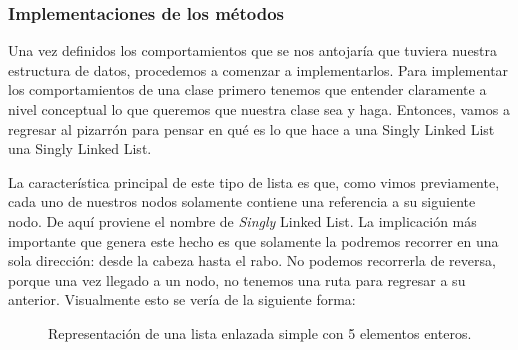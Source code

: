 \documentclass[11pt]{article}
\begin{document}
\subsubsection{Implementaciones de los métodos}
\label{sec:orgdb9b995}

Una vez definidos los comportamientos que se nos antojaría que tuviera nuestra estructura de datos, procedemos a comenzar a implementarlos. Para implementar los comportamientos de una clase primero tenemos que entender claramente a nivel conceptual lo que queremos que nuestra clase sea y haga. Entonces, vamos a regresar al pizarrón para pensar en qué es lo que hace a una Singly Linked List una Singly Linked List.

La característica principal de este tipo de lista es que, como vimos previamente, cada uno de nuestros nodos solamente contiene una referencia a su siguiente nodo. De aquí proviene el nombre de \emph{Singly} Linked List. La implicación más importante que genera este hecho es que solamente la podremos recorrer en una sola dirección: desde la cabeza hasta el rabo. No podemos recorrerla de reversa, porque una vez llegado a un nodo, no tenemos una ruta para regresar a su anterior. Visualmente esto se vería de la siguiente forma:

\begin{figure}[h]
\centering
{}
\caption{Representación de una lista enlazada simple con 5 elementos enteros.}
\end{figure}
\end{document}
